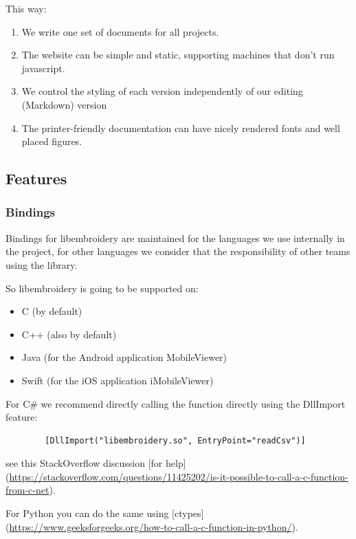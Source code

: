 \documentclass[a4paper, 11pt]{report}
\begin{document}
This way:

\begin{enumerate}
\item We write one set of documents for all projects.
\item The website can be simple and static, supporting machines that don't run javascript.
\item We control the styling of each version independently of our editing (Markdown) version
\item The printer-friendly documentation can have nicely rendered fonts and well placed figures.
\end{enumerate}

\subsection{Features}

\subsubsection{Bindings}

Bindings for libembroidery are maintained for the languages we use internally in the project, for other languages we consider that the responsibility of other teams using the library.

So libembroidery is going to be supported on:

\begin{itemize}
  \item C (by default)
  \item C++ (also by default)
  \item Java (for the Android application MobileViewer)
  \item Swift (for the iOS application iMobileViewer)
\end{itemize}

For C\# we recommend directly calling the function directly
using the DllImport feature:

\begin{verbatim}
        [DllImport("libembroidery.so", EntryPoint="readCsv")]
\end{verbatim}

see this StackOverflow discussion [for help](\url{https://stackoverflow.com/questions/11425202/is-it-possible-to-call-a-c-function-from-c-net}).

For Python you can do the same using [ctypes](\url{https://www.geeksforgeeks.org/how-to-call-a-c-function-in-python/}).
\end{document}
